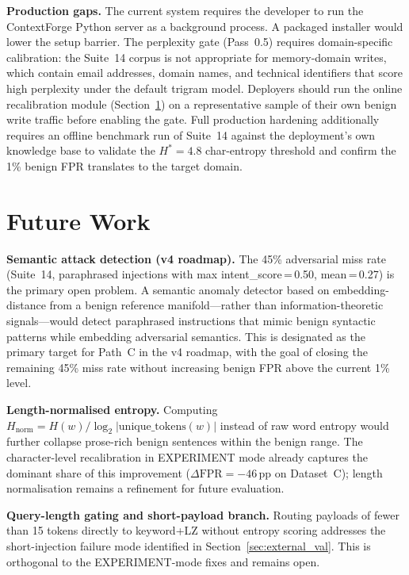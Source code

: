 \documentclass[11pt,twocolumn]{article}
\begin{document}
\textbf{Production gaps.}
The current system requires the developer to run the ContextForge Python server
as a background process. A packaged installer would lower the setup barrier.
The perplexity gate (Pass~0.5) requires domain-specific calibration: the Suite~14
corpus is not appropriate for memory-domain writes, which
contain email addresses, domain names, and technical identifiers that score high
perplexity under the default trigram model. Deployers should run the online
recalibration module (Section~\ref{sec:future}) on a representative sample of
their own benign write traffic before enabling the gate.
Full production hardening additionally requires an offline benchmark run of
Suite~14 against the deployment's own knowledge base to validate the
$H^{*}=4.8$ char-entropy threshold and confirm the 1\% benign FPR translates
to the target domain.

\section{Future Work}
\label{sec:future}

\textbf{Semantic attack detection (v4 roadmap).}
The 45\% adversarial miss rate (Suite~14, paraphrased injections with
max intent\_score\,=\,0.50, mean\,=\,0.27) is the primary open problem.
A semantic anomaly detector based on embedding-distance from a benign reference
manifold---rather than information-theoretic signals---would detect paraphrased
instructions that mimic benign syntactic patterns while embedding adversarial
semantics. This is designated as the primary target for Path~C in the v4
roadmap, with the goal of closing the remaining 45\% miss rate without
increasing benign FPR above the current 1\% level.

\textbf{Length-normalised entropy.}
Computing $H_{\mathrm{norm}} = H(w)/\log_2|\text{unique\_tokens}(w)|$ instead
of raw word entropy would further collapse prose-rich benign sentences within
the benign range. The character-level recalibration in EXPERIMENT mode already
captures the dominant share of this improvement ($\Delta\text{FPR}=-46$\,pp on
Dataset~C); length normalisation remains a refinement for future evaluation.

\textbf{Query-length gating and short-payload branch.}
Routing payloads of fewer than 15 tokens directly to keyword+LZ without entropy
scoring addresses the short-injection failure mode identified in Section~\ref{sec:external_val}.
This is orthogonal to the EXPERIMENT-mode fixes and remains open.
\end{document}
